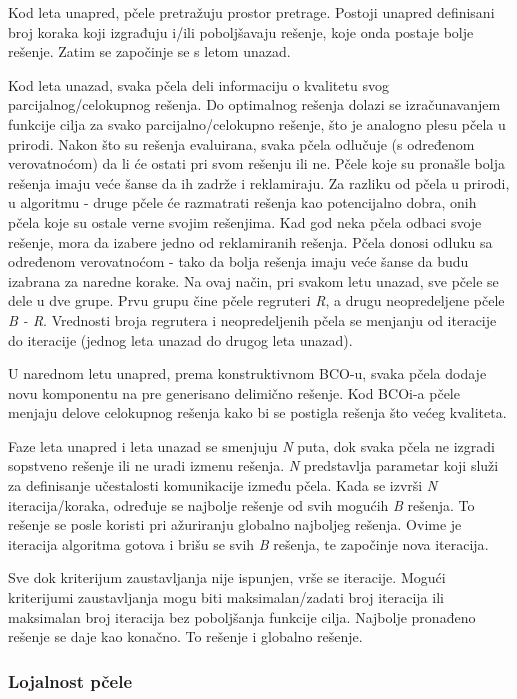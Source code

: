 \documentclass[a4paper]{article}
\begin{document}
{Kod leta unapred, pčele pretražuju prostor pretrage. Postoji unapred definisani broj koraka koji izgrađuju i/ili poboljšavaju rešenje, koje onda postaje bolje rešenje. Zatim se započinje se s letom unazad.

Kod leta unazad, svaka pčela deli informaciju o kvalitetu svog parcijalnog/celokupnog rešenja. Do optimalnog rešenja dolazi se izračunavanjem funkcije cilja za svako parcijalno/celokupno rešenje, što je analogno plesu pčela u prirodi. Nakon što su rešenja evaluirana, svaka pčela odlučuje (s određenom verovatnoćom) da li će ostati pri svom rešenju ili ne. Pčele koje su pronašle bolja rešenja imaju veće šanse da ih zadrže i reklamiraju. Za razliku od pčela u prirodi, u algoritmu - druge pčele će razmatrati rešenja kao potencijalno dobra, onih pčela koje su ostale verne svojim rešenjima. Kad god neka pčela odbaci svoje rešenje, mora da izabere jedno od reklamiranih rešenja. Pčela donosi odluku sa određenom verovatnoćom - tako da bolja rešenja imaju veće šanse da budu izabrana za naredne korake. Na ovaj način, pri svakom letu unazad, sve pčele se dele u dve grupe. Prvu grupu čine pčele regruteri {\em R}, a drugu neopredeljene pčele {\em B - R}. Vrednosti broja regrutera i neopredeljenih pčela se menjanju od iteracije do iteracije (jednog leta unazad do drugog leta unazad)\cite{bcoalg}. 

U narednom letu unapred, prema konstruktivnom BCO-u, svaka pčela dodaje novu komponentu na pre generisano delimično rešenje. Kod BCOi-a pčele menjaju delove celokupnog rešenja kako bi se postigla rešenja što većeg kvaliteta\cite{bcoalg}.

Faze leta unapred i leta unazad se smenjuju {\em N} puta, dok svaka pčela ne izgradi sopstveno rešenje ili ne uradi izmenu rešenja. {\em N} predstavlja parametar koji služi za definisanje učestalosti komunikacije između pčela. Kada se izvrši {\em N} iteracija/koraka, određuje se najbolje rešenje od svih mogućih {\em B} rešenja. To rešenje se posle koristi pri ažuriranju globalno najboljeg rešenja. Ovime je iteracija algoritma gotova i brišu se svih {\em B} rešenja, te započinje nova iteracija\cite{bcoalg}.

Sve dok kriterijum zaustavljanja nije ispunjen, vrše se iteracije. Mogući kriterijumi zaustavljanja mogu biti maksimalan/zadati broj iteracija ili maksimalan broj iteracija bez poboljšanja funkcije cilja.
Najbolje pronađeno rešenje se daje kao konačno. To rešenje i globalno rešenje.

\subsubsection{Lojalnost pčele}
\label{subsubsec:lojalnost}

}
\end{document}
